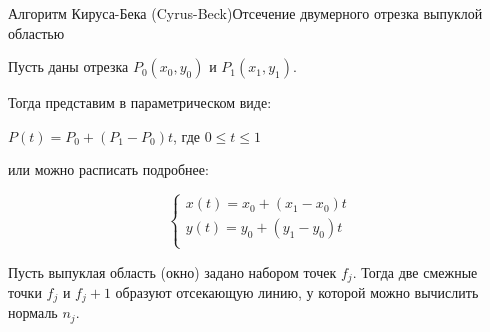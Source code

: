 \documentclass{beamer}
\begin{document}
	\begin{frame}{Алгоритм Кируса-Бека (Cyrus-Beck)}{Отсечение двумерного отрезка выпуклой областью}


		Пусть даны отрезка $P_0(x_0, y_0)$ и $P_1(x_1, y_1)$. 

		Тогда представим в параметрическом виде:

		$P(t) = P_0 + (P_1 - P_0)t$, где $0 \leqslant  t \leqslant 1$

		или можно расписать подробнее:

		\[
		\begin{cases}
			x(t) = x_0 + (x_1 - x_0) t\\
			y(t) = y_0 + (y_1 - y_0) t\\
		\end{cases}	
		\]

		Пусть выпуклая область (окно) задано набором точек $f_j$. Тогда две смежные точки $f_j$ и $f_j+1$ образуют отсекающую линию, у которой можно вычислить нормаль $n_j$.

	\end{frame}
\end{document}
